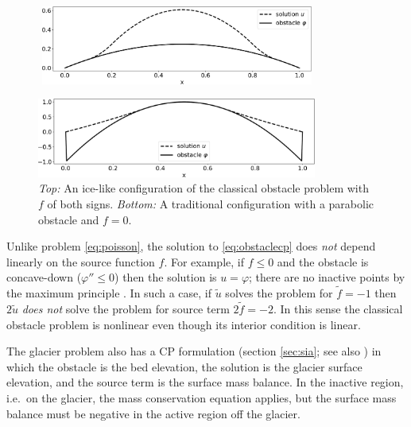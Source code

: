 \documentclass[letterpaper,final,12pt,reqno]{amsart}
\theoremstyle{claim}
\numberwithin{equation}{section}
\numberwithin{figure}{section}
\numberwithin{table}{section}
\numberwithin{theorem}{section}
\begin{document}
\begin{figure}
\,\,\includegraphics[width=0.8\textwidth]{fixfigs/icelike.pdf}

\bigskip\medskip
\includegraphics[width=0.82\textwidth]{fixfigs/parabola.pdf}

\medskip
\caption{\emph{Top:} An ice-like configuration of the classical obstacle problem with $f$ of both signs. \emph{Bottom:} A traditional configuration with a parabolic obstacle and $f=0$.}
\label{fig:icelike}
\end{figure}

Unlike problem \eqref{eq:poisson}, the solution to \eqref{eq:obstaclecp} does \emph{not} depend linearly on the source function $f$.  For example, if $f \le 0$ and the obstacle is concave-down ($\varphi'' \le 0$) then the solution is $u=\varphi$; there are no inactive points by the maximum principle \cite{Evans2010}.  In such a case, if $\tilde u$ solves the problem for $\tilde f= -1$ then $2\tilde u$ \emph{does not} solve the problem for source term $2\tilde f = -2$.  In this sense the classical obstacle problem is nonlinear even though its interior condition is linear.

The glacier problem also has a CP formulation (section \ref{sec:sia}; see also \cite{Calvoetal2002}) in which the obstacle is the bed elevation, the solution is the glacier surface elevation, and the source term is the surface mass balance.  In the inactive region, i.e.~on the glacier, the mass conservation equation applies, but the surface mass balance must be negative in the active region off the glacier.
\end{document}
